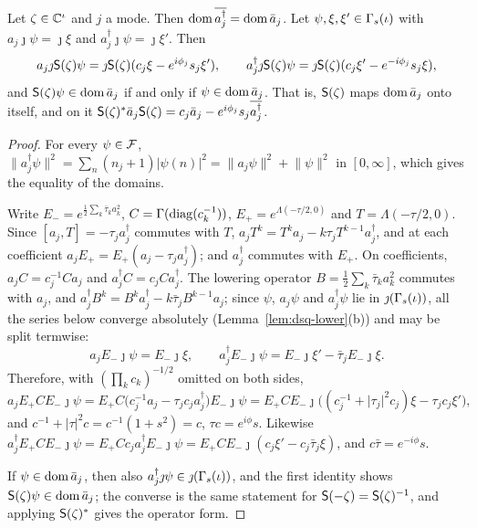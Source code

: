 \begin{veteenv}
\begin{theorem}\label{thm:dsq-squeeze-intertwine}
Let $\zeta\in\mathbb C^\iota$ and $j$ a mode. Then $\operatorname{dom}\overline{a_j^\dagger}=\operatorname{dom}\bar a_j$. Let $\psi,\xi,\xi'\in\Gamma_s(\iota)$ with $a_j\jmath\psi=\jmath\xi$
and $a_j^\dagger\jmath\psi=\jmath\xi'$. Then
\[
 a_j\jmath\mathsf S(\zeta)\psi=\jmath\mathsf S(\zeta)(c_j\xi-e^{i\phi_j}s_j\xi'),\qquad a_j^\dagger\jmath\mathsf S(\zeta)\psi=\jmath\mathsf S(\zeta)(c_j\xi'-e^{-i\phi_j}s_j\xi),
\]
and $\mathsf S(\zeta)\psi\in\operatorname{dom}\bar a_j$ if and only if $\psi\in\operatorname{dom}\bar a_j$. That is, $\mathsf S(\zeta)$ maps $\operatorname{dom}\bar a_j$ onto itself, and on
it $\mathsf S(\zeta)^*\bar a_j\mathsf S(\zeta)=c_j\bar a_j-e^{i\phi_j}s_j\overline{a_j^\dagger}$.
\end{theorem}

\begin{proof}
For every $\psi\in\mathcal F$, $\lVert a_j^\dagger\psi\rVert^2=\sum_n(n_j+1)\lvert\psi(n)\rvert^2=\lVert a_j\psi\rVert^2+\lVert\psi\rVert^2$ in
$[0,\infty]$, which gives the equality of the domains.

Write $E_-=e^{\frac12\sum_k\bar\tau_ka_k^2}$, $C=\Gamma(\operatorname{diag}(c_k^{-1}))$, $E_+=e^{\Lambda(-\tau/2,0)}$ and $T=\Lambda(-\tau/2,0)$. Since
$[a_j,T]=-\tau_ja_j^\dagger$ commutes with $T$, $a_jT^k=T^ka_j-k\tau_jT^{k-1}a_j^\dagger$, and at each coefficient
$a_jE_+=E_+(a_j-\tau_ja_j^\dagger)$; and $a_j^\dagger$ commutes with $E_+$. On coefficients, $a_jC=c_j^{-1}Ca_j$ and $a_j^\dagger C=c_jCa_j^\dagger$.
The lowering operator $B=\frac12\sum_k\bar\tau_ka_k^2$ commutes with $a_j$, and $a_j^\dagger B^k=B^ka_j^\dagger-k\bar\tau_jB^{k-1}a_j$; since
$\psi$, $a_j\psi$ and $a_j^\dagger\psi$ lie in $\jmath(\Gamma_s(\iota))$, all the series below converge absolutely (Lemma~\ref{lem:dsq-lower}(b)) and may be
split termwise:
\[
 a_jE_-\jmath\psi=E_-\jmath\xi,\qquad a_j^\dagger E_-\jmath\psi=E_-\jmath\xi'-\bar\tau_jE_-\jmath\xi .
\]
Therefore, with $(\prod_kc_k)^{-1/2}$ omitted on both sides,
\[
 a_jE_+CE_-\jmath\psi=E_+C\bigl(c_j^{-1}a_j-\tau_jc_ja_j^\dagger\bigr)E_-\jmath\psi
 =E_+CE_-\jmath\bigl((c_j^{-1}+\lvert\tau_j\rvert^2c_j)\xi-\tau_jc_j\xi'\bigr),
\]
and $c^{-1}+\lvert\tau\rvert^2c=c^{-1}(1+s^2)=c$, $\tau c=e^{i\phi}s$. Likewise $a_j^\dagger E_+CE_-\jmath\psi=E_+Cc_ja_j^\dagger E_-\jmath\psi=
E_+CE_-\jmath(c_j\xi'-c_j\bar\tau_j\xi)$, and $c\bar\tau=e^{-i\phi}s$.

If $\psi\in\operatorname{dom}\bar a_j$, then also $a_j^\dagger\jmath\psi\in\jmath(\Gamma_s(\iota))$, and the first identity shows $\mathsf S(\zeta)\psi\in\operatorname{dom}\bar a_j$; the converse
is the same statement for $\mathsf S(-\zeta)=\mathsf S(\zeta)^{-1}$, and applying $\mathsf S(\zeta)^*$ gives the operator form.
\end{proof}


\end{veteenv}
